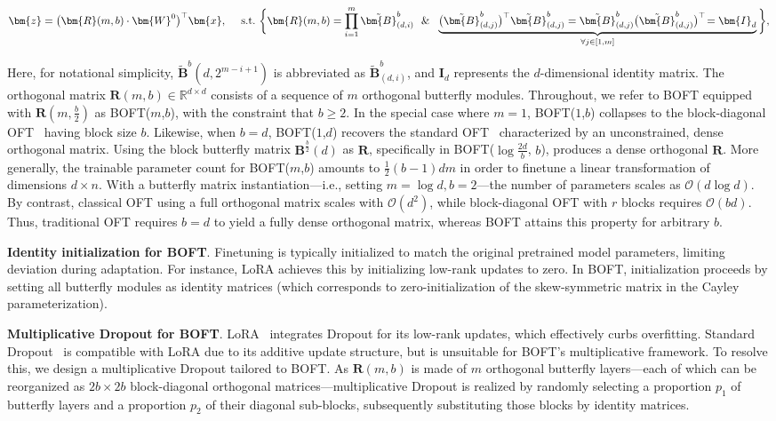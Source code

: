\begin{equation}
    \begin{aligned}\nonumber
    \bm{z}=\big(\bm{R}(m,b)\cdot\bm{W}^0\big)^\top\bm{x},~~~~\text{s.t.}~\bigg{\{}\bm{R}(m,b)=\prod_{i=1}^m \tilde{\bm{B}}^b_{(d,i)}~~\&~~\underbrace{\big(\tilde{\bm{B}}^b_{(d,j)}\big)^\top\tilde{\bm{B}}^b_{(d,j)}=\tilde{\bm{B}}^b_{(d,j)}\big(\tilde{\bm{B}}^b_{(d,j)}\big)^\top\!=\bm{I}_d}_{\forall j\in [1, m]}\bigg{\}},
    \end{aligned}
\end{equation}

Here, for notational simplicity, $\tilde{\bm{B}}^b(d,2^{m - i+1})$ is abbreviated as $\tilde{\bm{B}}^b_{(d,i)}$, and $\bm{I}_d$ represents the $d$-dimensional identity matrix. The orthogonal matrix $\bm{R}(m,b)\in\mathbb{R}^{d\times d}$ consists of a sequence of $m$ orthogonal butterfly modules. Throughout, we refer to BOFT equipped with $\bm{R}(m,\frac{b}{2})$ as BOFT($m$,$b$), with the constraint that $b \geq 2$. In the special case where $m=1$, BOFT($1$,$b$) collapses to the block-diagonal OFT~\cite{qiu2023controlling} having block size $b$. Likewise, when $b=d$, BOFT($1$,$d$) recovers the standard OFT~\cite{qiu2023controlling} characterized by an unconstrained, dense orthogonal matrix. Using the block butterfly matrix $\bm{B}^{\frac{b}{2}}(d)$ as $\bm{R}$, specifically in BOFT($\log \frac{2d}{b}$, $b$), produces a dense orthogonal $\bm{R}$. More generally, the trainable parameter count for BOFT($m$,$b$) amounts to $\frac{1}{2}(b-1)dm$ in order to finetune a linear transformation of dimensions $d\times n$. With a butterfly matrix instantiation—i.e., setting $m=\log d, b=2$—the number of parameters scales as $\mathcal{O}(d\log d)$. By contrast, classical OFT using a full orthogonal matrix scales with $\mathcal{O}(d^2)$, while block-diagonal OFT with $r$ blocks requires $\mathcal{O}(bd)$. Thus, traditional OFT requires $b=d$ to yield a fully dense orthogonal matrix, whereas BOFT attains this property for arbitrary $b$.

\textbf{Identity initialization for BOFT}. Finetuning is typically initialized to match the original pretrained model parameters, limiting deviation during adaptation. For instance, LoRA achieves this by initializing low-rank updates to zero. In BOFT, initialization proceeds by setting all butterfly modules as identity matrices (which corresponds to zero-initialization of the skew-symmetric matrix in the Cayley parameterization).

\textbf{Multiplicative Dropout for BOFT}. LoRA~\cite{hulora2022} integrates Dropout for its low-rank updates, which effectively curbs overfitting. Standard Dropout~\cite{srivastava2014dropout} is compatible with LoRA due to its additive update structure, but is unsuitable for BOFT’s multiplicative framework. To resolve this, we design a multiplicative Dropout tailored to BOFT. As $\bm{R}(m,b)$ is made of $m$ orthogonal butterfly layers—each of which can be reorganized as $2b\times 2b$ block-diagonal orthogonal matrices—multiplicative Dropout is realized by randomly selecting a proportion $p_1$ of butterfly layers and a proportion $p_2$ of their diagonal sub-blocks, subsequently substituting those blocks by identity matrices.

